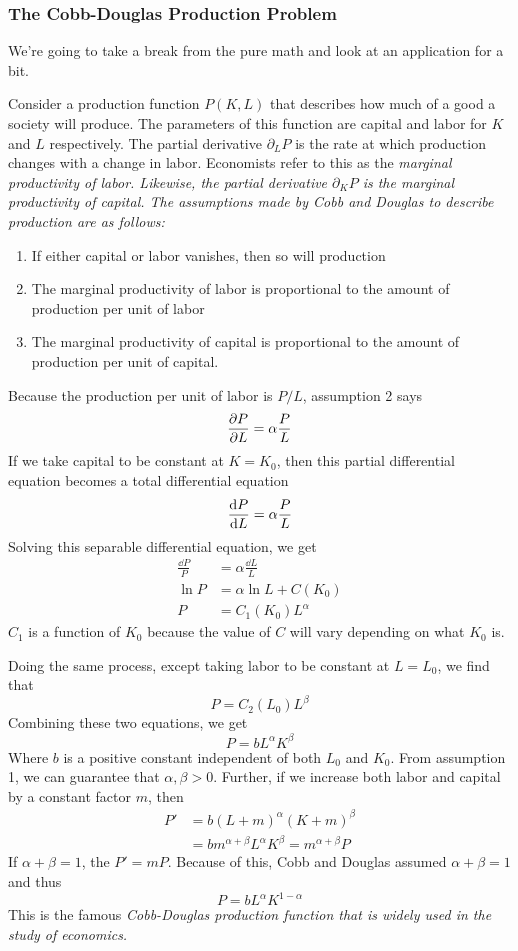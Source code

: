 \subsubsection{The Cobb-Douglas Production Problem}
We're going to take a break from the pure math and look at an application for a bit.\par
Consider a production function \(P(K, L)\) that describes how much of a good a society will produce. The parameters of this function are capital and labor for \(K\) and \(L\) respectively. The partial derivative \(\partial_LP\) is the rate at which production changes with a change in labor. Economists refer to this as the \it{marginal productivity of labor}. Likewise, the partial derivative \(\partial_KP\) is the \it{marginal productivity of capital}. The assumptions made by Cobb and Douglas to describe production are as follows:
\begin{enumerate}
    \item If either capital or labor vanishes, then so will production
    \item The marginal productivity of labor is proportional to the amount of production per unit of labor 
    \item The marginal productivity of capital is proportional to the amount of production per unit of capital.
\end{enumerate}
Because the production per unit of labor is \(P/L\), assumption 2 says
\[ \pdv{P}{L} = \alpha \frac{P}{L}\]
If we take capital to be constant at \(K=K_0\), then this partial differential equation becomes a total differential equation
\[ \dv{P}{L} = \alpha\frac{P}{L} \]
Solving this separable differential equation, we get
\begin{align*}
    \frac{\dd P}{P} &= \alpha \frac{\dd L}{L} \\
    \ln P &= \alpha \ln L + C(K_0) \\
    P &=  C_1(K_0)L^\alpha
\end{align*}
\(C_1\) is a function of \(K_0\) because the value of \(C\) will vary depending on what \(K_0\) is.\par Doing the same process, except taking labor to be constant at \(L=L_0\), we find that 
\[ P = C_2(L_0)L^\beta \]
Combining these two equations, we get
\[ P = bL^\alpha K^\beta \]
Where \(b\) is a positive constant independent of both \(L_0\) and \(K_0\). From assumption 1, we can guarantee that \(\alpha, \beta  > 0\). Further, if we increase both labor and capital by a constant factor \(m\), then
\begin{align*}
    P' &= b(L+m)^\alpha (K+m)^\beta \\
    &= bm^{\alpha + \beta}L^\alpha K^\beta = m^{\alpha + \beta}P
\end{align*}
If \(\alpha + \beta = 1\), the \(P'=mP\). Because of this, Cobb and Douglas assumed \(\alpha + \beta = 1\) and thus 
\[ P = bL^\alpha K^{1-\alpha}\]
This is the famous \it{Cobb-Douglas production function} that is widely used in the study of economics.
